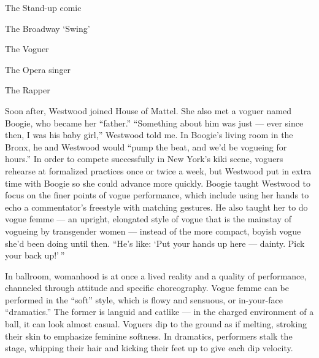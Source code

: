 The Stand-up comic

\href{https://www.nytimes3xbfgragh.onion/interactive/2019/05/30/magazine/aladdin-musical-new-york.html}{}

The Broadway `Swing'

\href{https://www.nytimes3xbfgragh.onion/interactive/2019/05/30/magazine/vogue-kiki-new-york.html}{}

The Voguer

\href{https://www.nytimes3xbfgragh.onion/interactive/2019/05/30/magazine/metropolitan-opera-singer-new-york.html}{}

The Opera singer

\href{https://www.nytimes3xbfgragh.onion/interactive/2019/05/30/magazine/princess-nokia-new-york.html}{}

The Rapper

Soon after, Westwood joined House of Mattel. She also met a voguer named
Boogie, who became her ``father.'' ``Something about him was just ---
ever since then, I was his baby girl,'' Westwood told me. In Boogie's
living room in the Bronx, he and Westwood would ``pump the beat, and
we'd be vogueing for hours.'' In order to compete successfully in New
York's kiki scene, voguers rehearse at formalized practices once or
twice a week, but Westwood put in extra time with Boogie so she could
advance more quickly. Boogie taught Westwood to focus on the finer
points of vogue performance, which include using her hands to echo a
commentator's freestyle with matching gestures. He also taught her to do
vogue femme --- an upright, elongated style of vogue that is the
mainstay of vogueing by transgender women --- instead of the more
compact, boyish vogue she'd been doing until then. ``He's like: `Put
your hands up here --- dainty. Pick your back up!' ''

In ballroom, womanhood is at once a lived reality and a quality of
performance, channeled through attitude and specific choreography. Vogue
femme can be performed in the ``soft'' style, which is flowy and
sensuous, or in-your-face ``dramatics.'' The former is languid and
catlike --- in the charged environment of a ball, it can look almost
casual. Voguers dip to the ground as if melting, stroking their skin to
emphasize feminine softness. In dramatics, performers stalk the stage,
whipping their hair and kicking their feet up to give each dip velocity.

